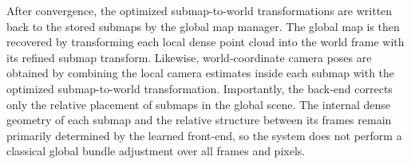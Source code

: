 After convergence, the optimized submap-to-world transformations are written back to the stored submaps by the global map manager. The global map is then recovered by transforming each local dense point cloud into the world frame with its refined submap transform. Likewise, world-coordinate camera poses are obtained by combining the local camera estimates inside each submap with the optimized submap-to-world transformation. Importantly, the back-end corrects only the relative placement of submaps in the global scene. The internal dense geometry of each submap and the relative structure between its frames remain primarily determined by the learned front-end, so the system does not perform a classical global bundle adjustment over all frames and pixels.
